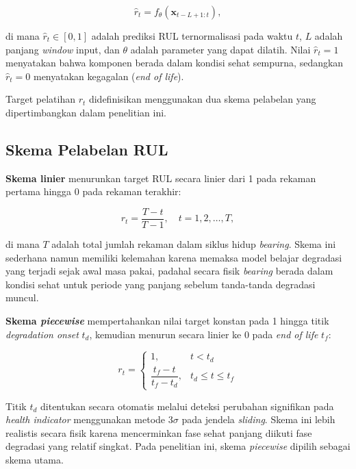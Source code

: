 \begin{equation}\label{eq:bab3_rul_mapping}
  \hat{r}_t = f_\theta(\mathbf{x}_{t-L+1:t}),
\end{equation}

\noindent di mana $\hat{r}_t \in [0, 1]$ adalah prediksi RUL ternormalisasi
pada waktu $t$, $L$ adalah panjang \emph{window} input, dan $\theta$ adalah
parameter yang dapat dilatih. Nilai $\hat{r}_t = 1$ menyatakan bahwa komponen
berada dalam kondisi sehat sempurna, sedangkan $\hat{r}_t = 0$ menyatakan
kegagalan (\emph{end of life}).

Target pelatihan $r_t$ didefinisikan menggunakan dua skema pelabelan yang
dipertimbangkan dalam penelitian ini.

\subsection{Skema Pelabelan RUL}
\label{subsec:bab3_skema_label}

\textbf{Skema linier} menurunkan target RUL secara linier dari 1 pada
rekaman pertama hingga 0 pada rekaman terakhir:

\begin{equation}\label{eq:bab3_label_linier}
  r_t = \frac{T - t}{T - 1}, \quad t = 1, 2, \ldots, T,
\end{equation}

\noindent di mana $T$ adalah total jumlah rekaman dalam siklus hidup \emph{bearing}.
Skema ini sederhana namun memiliki kelemahan karena memaksa model belajar
degradasi yang terjadi sejak awal masa pakai, padahal secara fisik \emph{bearing}
berada dalam kondisi sehat untuk periode yang panjang sebelum tanda-tanda
degradasi muncul.

\textbf{Skema \emph{piecewise}} 
mempertahankan nilai target konstan pada 1 hingga titik \emph{degradation
onset} $t_d$, kemudian menurun secara linier ke 0 pada \emph{end of life} $t_f$:

\begin{equation}\label{eq:bab3_label_piecewise}
  r_t = \begin{cases}
    1, & t < t_d \\
    \dfrac{t_f - t}{t_f - t_d}, & t_d \leq t \leq t_f
  \end{cases}
\end{equation}

\noindent Titik $t_d$ ditentukan secara otomatis melalui deteksi perubahan
signifikan pada \emph{health indicator} menggunakan metode $3\sigma$ pada
jendela \emph{sliding}. Skema ini lebih realistis secara fisik karena mencerminkan
fase sehat panjang diikuti fase degradasi yang relatif singkat. Pada penelitian
ini, skema \emph{piecewise} dipilih sebagai skema utama.


